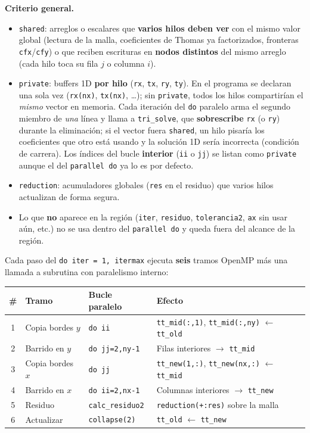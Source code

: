 \documentclass[11pt,a4paper]{article}
\begin{document}
\textbf{Criterio general.}
\begin{itemize}
  \item \texttt{shared}: arreglos o escalares que \textbf{varios hilos deben ver}
        con el mismo valor global (lectura de la malla, coeficientes de Thomas
        ya factorizados, fronteras \texttt{cfx}/\texttt{cfy}) o que reciben
        escrituras en \textbf{nodos distintos} del mismo arreglo (cada hilo toca
        su fila $j$ o columna $i$).
  \item \texttt{private}: buffers 1D \textbf{por hilo} (\texttt{rx}, \texttt{tx},
        \texttt{ry}, \texttt{ty}). En el programa se declaran una sola vez
        (\texttt{rx(nx)}, \texttt{tx(nx)}, \ldots); sin \texttt{private}, todos
        los hilos compartir\'ian el \emph{mismo} vector en memoria. Cada
        iteraci\'on del \texttt{do} paralelo arma el segundo miembro de
        \emph{una} l\'inea y llama a \texttt{tri\_solve}, que \textbf{sobrescribe}
        \texttt{rx} (o \texttt{ry}) durante la eliminaci\'on; si el vector fuera
        \texttt{shared}, un hilo pisar\'ia los coeficientes que otro est\'a usando
        y la soluci\'on 1D ser\'ia incorrecta (condici\'on de carrera). Los \'indices del bucle \textbf{interior}
        (\texttt{ii} o \texttt{jj}) se listan como \texttt{private} aunque el
        del \texttt{parallel do} ya lo es por defecto.
  \item \texttt{reduction}: acumuladores globales (\texttt{res} en el residuo)
        que varios hilos actualizan de forma segura.
  \item Lo que \textbf{no} aparece en la regi\'on (\texttt{iter}, \texttt{residuo},
        \texttt{tolerancia2}, \texttt{ax} sin usar a\'un, etc.) no se usa dentro
        del \texttt{parallel do} y queda fuera del alcance de la regi\'on.
\end{itemize}

\medskip

Cada paso del \texttt{do iter = 1, itermax} ejecuta \textbf{seis} tramos OpenMP
m\'as una llamada a subrutina con paralelismo interno:

\begin{center}
\begin{tabular}{clll}
\hline
\# & Tramo & Bucle paralelo & Efecto \\
\hline
1 & Copia bordes $y$ & \texttt{do ii} & \texttt{tt\_mid(:,1)}, \texttt{tt\_mid(:,ny)} $\leftarrow$ \texttt{tt\_old} \\
2 & Barrido en $y$  & \texttt{do jj=2,ny-1} & Filas interiores $\rightarrow$ \texttt{tt\_mid} \\
3 & Copia bordes $x$ & \texttt{do jj} & \texttt{tt\_new(1,:)}, \texttt{tt\_new(nx,:)} $\leftarrow$ \texttt{tt\_mid} \\
4 & Barrido en $x$  & \texttt{do ii=2,nx-1} & Columnas interiores $\rightarrow$ \texttt{tt\_new} \\
5 & Residuo         & \texttt{calc\_residuo2} & \texttt{reduction(+:res)} sobre la malla \\
6 & Actualizar      & \texttt{collapse(2)} & \texttt{tt\_old} $\leftarrow$ \texttt{tt\_new} \\
\hline
\end{tabular}
\end{center}
\end{document}
